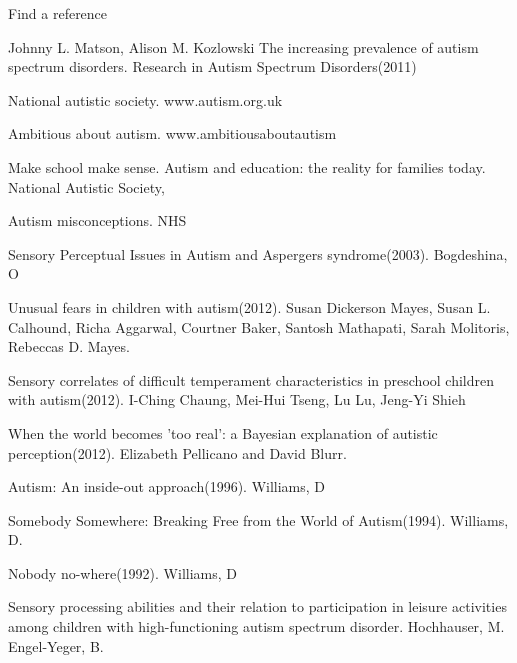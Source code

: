\documentclass[11pt]{report}
\begin{document}
\begin{thebibliography}{9}

Find a reference

Johnny L. Matson, Alison M. Kozlowski
The increasing prevalence of autism spectrum disorders. Research in Autism Spectrum Disorders(2011)

National autistic society. www.autism.org.uk

Ambitious about autism. www.ambitiousaboutautism

Make school make sense. Autism and education: the reality for families today. National Autistic Society, 

Autism misconceptions. NHS

Sensory Perceptual Issues in Autism and Aspergers syndrome(2003). Bogdeshina, O

Unusual fears in children with autism(2012). Susan Dickerson Mayes, Susan L. Calhound, Richa Aggarwal, Courtner Baker, Santosh Mathapati, Sarah Molitoris, Rebeccas D. Mayes.

Sensory correlates of difficult temperament characteristics in preschool children with autism(2012). I-Ching Chaung, Mei-Hui Tseng, Lu Lu, Jeng-Yi Shieh

When the world becomes 'too real': a Bayesian explanation of autistic perception(2012). Elizabeth Pellicano and David Blurr.

Autism: An inside-out approach(1996). Williams, D

Somebody Somewhere: Breaking Free from the World of Autism(1994). Williams, D.

Nobody no-where(1992). Williams, D

Sensory processing abilities and their relation to participation in leisure activities among children with high-functioning autism spectrum disorder. Hochhauser, M. Engel-Yeger, B.


\end{thebibliography}
\end{document}
